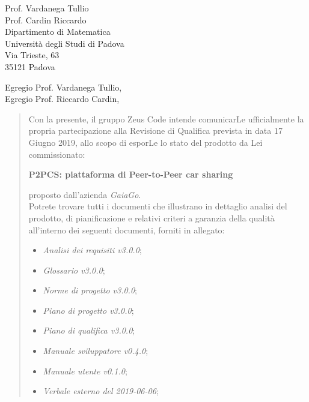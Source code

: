 \begin{letter}{
		Prof. Vardanega Tullio \\
		Prof. Cardin Riccardo \\
		Dipartimento di Matematica \\
		Università degli Studi di Padova \\
		Via Trieste, 63 \\
		35121 Padova}
		
\opening{Egregio Prof. Vardanega Tullio,\\Egregio Prof. Riccardo Cardin,}

\begin{quotation}
Con la presente, il gruppo Zeus Code intende comunicarLe ufficialmente la propria partecipazione alla Revisione di Qualifica prevista in data 17 Giugno 2019, allo scopo di esporLe lo stato del prodotto
da Lei commissionato:

\begin{center}
	\textbf{P2PCS: piattaforma di Peer-to-Peer car sharing}
\end{center}

\noindent proposto dall'azienda \textit{GaiaGo}.\\
Potrete trovare tutti i documenti che illustrano in dettaglio analisi del prodotto, di pianificazione e relativi criteri a garanzia della qualità all'interno dei seguenti 
documenti, forniti in allegato:

\bigskip

\begin{itemize}
	\item \textit{Analisi dei requisiti v3.0.0};
	
	\item \textit{Glossario v3.0.0};
	
	\item \textit{Norme di progetto v3.0.0};

	\item \textit{Piano di progetto v3.0.0};

	\item \textit{Piano di qualifica v3.0.0};
	
	\item \textit{Manuale sviluppatore v0.4.0};
	
	\item \textit{Manuale utente v0.1.0};


	\item \textit{Verbale esterno del 2019-06-06};
	

\end{itemize}
\end{quotation}
\end{letter}
